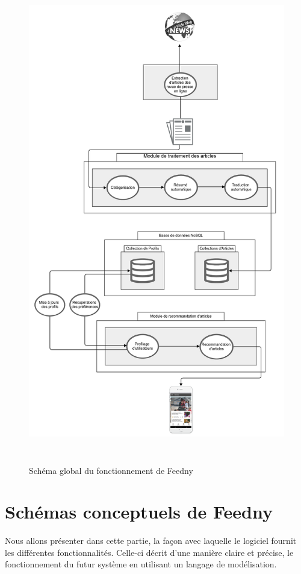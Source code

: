 \begin{figure}[H]
    \centering
    \includegraphics[height=600pt,width=450pt]{img/chapter3/global.png}
    \caption{Schéma global du fonctionnement de \textquotedbl Feedny\textquotedbl }
    \label{shemaglobal}
\end{figure}

\section{Schémas conceptuels de \textquotedbl Feedny\textquotedbl }
Nous allons présenter dans cette partie, la façon avec laquelle le logiciel fournit les différentes fonctionnalités. Celle-ci décrit d'une manière claire et précise, le fonctionnement du futur système en utilisant un langage de modélisation. 

